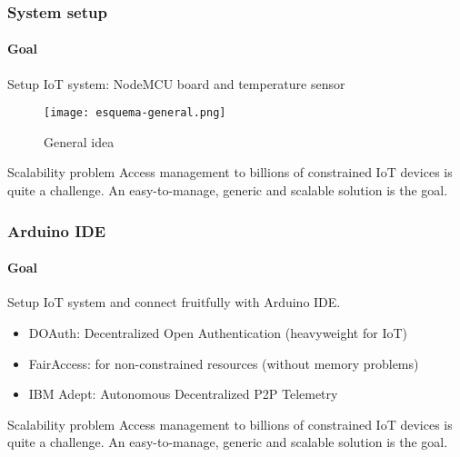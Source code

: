 \documentclass[
    aspectratio=169,                   %
]{beamer}
\begin{document}
    \begin{frame}
        \frametitle{System setup}
        
        \paragraph{Goal} Setup IoT system: NodeMCU board and temperature sensor

        \begin{figure}
            \centering
            \begin{stampbox}
                \texttt{[image: esquema-general.png]}
            \end{stampbox}
            \caption{General idea}
        \end{figure}

        \begin{block}{Scalability problem}
            Access management to billions of constrained IoT devices is quite a challenge. An easy-to-manage, generic and scalable solution is the goal.
        \end{block}
    \end{frame}

    \begin{frame}
        \frametitle{Arduino IDE}
        
        \paragraph{Goal} Setup IoT system and connect fruitfully with Arduino IDE.\cite{ouaddah}

        \begin{itemize}
            \item \alert{DOAuth}: Decentralized Open Authentication (heavyweight for IoT)
            \item \alert{FairAccess}: for non-constrained resources (without memory problems)
            \item \alert{IBM Adept}: Autonomous Decentralized P2P Telemetry
        \end{itemize}

        \begin{block}{Scalability problem}
            Access management to billions of constrained IoT devices is quite a challenge. An easy-to-manage, generic and scalable solution is the goal.
        \end{block}
    \end{frame}
\end{document}
